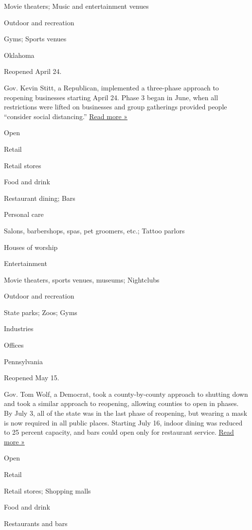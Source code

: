 Movie theaters; Music and entertainment venues

Outdoor and recreation

Gyms; Sports venues

Oklahoma

Reopened April 24.

Gov. Kevin Stitt, a Republican, implemented a three-phase approach to
reopening businesses starting April 24. Phase 3 began in June, when all
restrictions were lifted on businesses and group gatherings provided
people ``consider social distancing.''
\href{https://www.tulsaworld.com/news/oklahoma-to-begin-phase-3-of-reopening-monday-after-covid-19-data-shows-promising-downward/article_542617ce-c9e8-5825-bfdd-db6796999793.html\#18}{Read
more »}

Open

Retail

Retail stores

Food and drink

Restaurant dining; Bars

Personal care

Salons, barbershops, spas, pet groomers, etc.; Tattoo parlors

Houses of worship

Entertainment

Movie theaters, sports venues, museums; Nightclubs

Outdoor and recreation

State parks; Zoos; Gyms

Industries

Offices

Pennsylvania

Reopened May 15.

Gov. Tom Wolf, a Democrat, took a county-by-county approach to shutting
down and took a similar approach to reopening, allowing counties to open
in phases. By July 3, all of the state was in the last phase of
reopening, but wearing a mask is now required in all public places.
Starting July 16, indoor dining was reduced to 25 percent capacity, and
bars could open only for restaurant service.
\href{https://www.wgal.com/article/gov-tom-wolf-imposes-new-restrictions-on-pennsylvania-bars-restaurants-gatherings/33346910}{Read
more »}

Open

Retail

Retail stores; Shopping malls

Food and drink

Restaurants and bars

